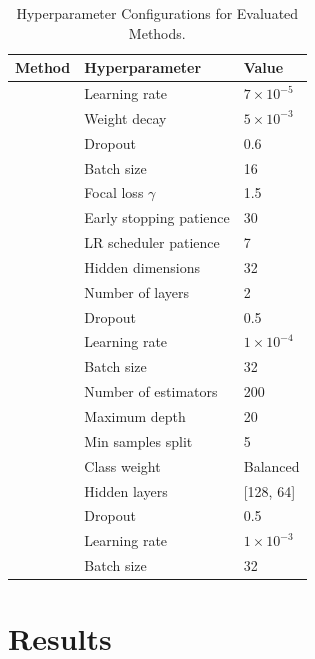 \documentclass[pdflatex,sn-vancouver-num, iicol]{sn-jnl}
\begin{document}
\begin{table}[h]
  \caption{Hyperparameter Configurations for Evaluated Methods.}
  \label{tab:hyperparameters}
  \begin{tabular*}{\columnwidth}{@{\extracolsep{\fill}}lll@{}}
    \toprule
    Method & Hyperparameter & Value \\
    \midrule
      & Learning rate & $7 \times 10^{-5}$ \\
      & Weight decay & $5 \times 10^{-3}$ \\
      & Dropout & 0.6 \\
      & Batch size & 16 \\
      & Focal loss $\gamma$ & 1.5 \\
      & Early stopping patience & 30 \\
      & LR scheduler patience & 7 \\
    \midrule
      & Hidden dimensions & 32 \\
      & Number of layers & 2 \\
      & Dropout & 0.5 \\
      & Learning rate & $1 \times 10^{-4}$ \\
      & Batch size & 32 \\
    \midrule
      & Number of estimators & 200 \\
      & Maximum depth & 20 \\
      & Min samples split & 5 \\
      & Class weight & Balanced \\
    \midrule
      & Hidden layers & [128, 64] \\
      & Dropout & 0.5 \\
      & Learning rate & $1 \times 10^{-3}$ \\
      & Batch size & 32 \\
    \bottomrule
  \end{tabular*}
\end{table}

\section{Results}
\end{document}
